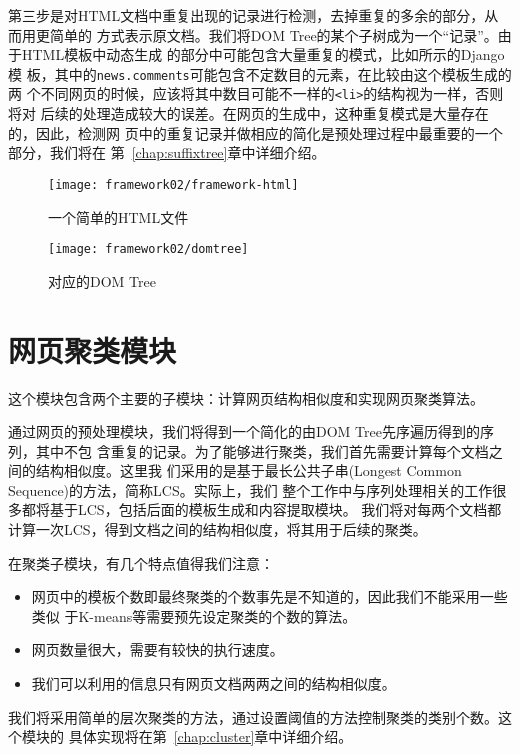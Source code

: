 第三步是对HTML文档中重复出现的记录进行检测，去掉重复的多余的部分，从而用更简单的
方式表示原文档。我们将DOM Tree的某个子树成为一个“记录”。由于HTML模板中动态生成
的部分中可能包含大量重复的模式，比如所示的Django模
板，其中的\texttt{news.comments}可能包含不定数目的元素，在比较由这个模板生成的两
个不同网页的时候，应该将其中数目可能不一样的\texttt{<li>}的结构视为一样，否则将对
后续的处理造成较大的误差。在网页的生成中，这种重复模式是大量存在的，因此，检测网
页中的重复记录并做相应的简化是预处理过程中最重要的一个部分，我们将在
第~\ref{chap:suffixtree}章中详细介绍。
\begin{figure}
  \begin{minipage}[t]{0.5\linewidth}
  \centering
  \texttt{[image: framework02/framework-html]}
  \caption{一个简单的HTML文件}
  \label{framework:fig:html}
\end{minipage}
\begin{minipage}[t]{0.5\linewidth}
  \centering
  \texttt{[image: framework02/domtree]}
  \caption{对应的DOM Tree}
  \label{framework:fig:domtree}
\end{minipage}
\end{figure}
\section{网页聚类模块}
\label{sec:clusterintro}
这个模块包含两个主要的子模块：计算网页结构相似度和实现网页聚类算法。

通过网页的预处理模块，我们将得到一个简化的由DOM Tree先序遍历得到的序列，其中不包
含重复的记录。为了能够进行聚类，我们首先需要计算每个文档之间的结构相似度。这里我
们采用的是基于最长公共子串(Longest Common Sequence)的方法，简称LCS。实际上，我们
整个工作中与序列处理相关的工作很多都将基于LCS，包括后面的模板生成和内容提取模块。
我们将对每两个文档都计算一次LCS，得到文档之间的结构相似度，将其用于后续的聚类。

在聚类子模块，有几个特点值得我们注意：
\begin{itemize}
\item 网页中的模板个数即最终聚类的个数事先是不知道的，因此我们不能采用一些类似
  于K-means等需要预先设定聚类的个数的算法。
\item 网页数量很大，需要有较快的执行速度。
\item 我们可以利用的信息只有网页文档两两之间的结构相似度。
\end{itemize}

我们将采用简单的层次聚类的方法，通过设置阈值的方法控制聚类的类别个数。这个模块的
具体实现将在第~\ref{chap:cluster}章中详细介绍。
